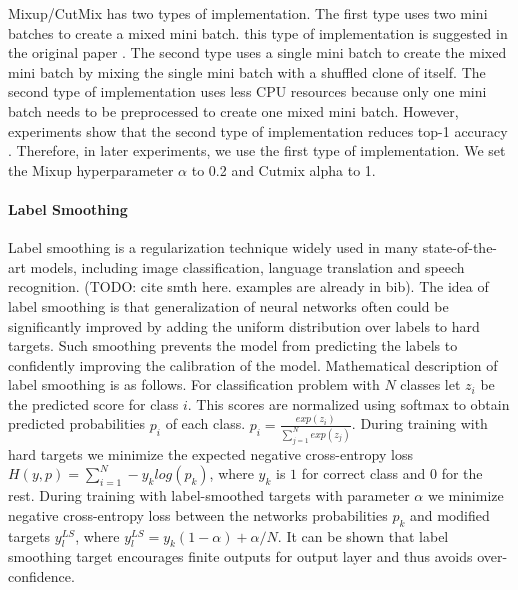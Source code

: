 Mixup/CutMix has two types of implementation. The first type uses two mini batches to create a mixed mini batch. this type of implementation is suggested in the original paper \cite{zhang2017_mixup}. The second type uses a single mini batch to create the mixed mini batch by mixing the single mini batch with a shuffled clone of itself. The second type of implementation uses less CPU resources because only one mini batch needs to be preprocessed to create one mixed mini batch. However, experiments show that the second type of implementation reduces top-1 accuracy \cite{lee2020_compounding_improvements}. Therefore, in later experiments, we use the first type of implementation. We set the Mixup hyperparameter $\alpha$ to 0.2 and Cutmix alpha to 1. 




\paragraph{Label Smoothing}

Label smoothing is a regularization technique widely used in many state-of-the-art models, including image classification, language translation and speech recognition. (TODO: cite smth here. examples are already in bib). The idea of label smoothing is that generalization of neural networks often could be significantly improved by adding the uniform distribution over labels to hard targets. Such smoothing prevents the model from predicting the labels to confidently improving the calibration of the model.  Mathematical description of label smoothing is as follows. For classification problem with $N$ classes let $z_i$ be the predicted score for class $i$. This scores are normalized using softmax to obtain predicted probabilities $p_i$ of each class. $p_i = \frac{exp(z_i)}{\sum_{j=1}^N exp(z_j)} $. During training with hard targets we minimize the expected negative cross-entropy loss $H(y, p) = \sum_{i=1}^N -y_k log(p_k)$, where $y_k$ is $1$ for correct class and $0$ for the rest. During training with label-smoothed targets with parameter $\alpha$ we minimize negative cross-entropy loss between the networks probabilities $p_k$ and modified targets  $y_l^{LS}$, where $y_l^{LS} = y_k (1 - \alpha ) + \alpha / N$. It can be shown \cite{he2019_bag_of_tricks} that label smoothing target encourages finite outputs for output layer and thus avoids over-confidence.


